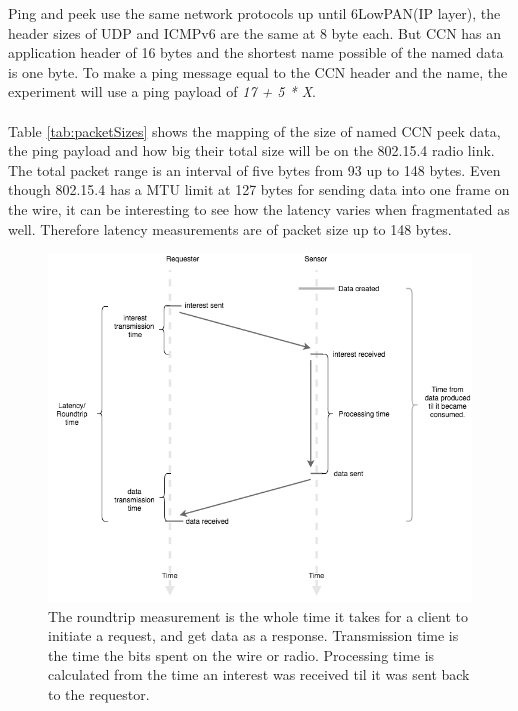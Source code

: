 Ping and peek use the same network protocols up until 6LowPAN(IP layer), the header sizes of UDP and ICMPv6 are the same at 8 byte each. But CCN has an application header of 16 bytes and the shortest name possible of the named data is one byte. To make a ping message equal to the CCN header and the name, the experiment will use a ping payload of \textit{17 + 5 * X}. 
\\\\Table \ref{tab:packetSizes} shows the mapping of the size of named CCN peek data, the ping payload and how big their total size will be on the 802.15.4 radio link. The total packet range is an interval of five bytes from 93 up to 148 bytes. 
Even though 802.15.4 has a MTU limit at 127 bytes for sending data into one frame on the wire, it can be interesting to see how the latency varies when fragmentated as well. Therefore latency measurements are of packet size up to 148 bytes.

\begin{figure}
    \includegraphics[width=\textwidth]{figures/latency.png}
    \caption{The roundtrip measurement is the whole time it takes for a client to initiate a request, and get data as a response. Transmission time is the time the bits spent on the wire or radio. Processing time is calculated from the time an interest was received til it was sent back to the requestor.}
    \label{fig:latency}
\end{figure}



